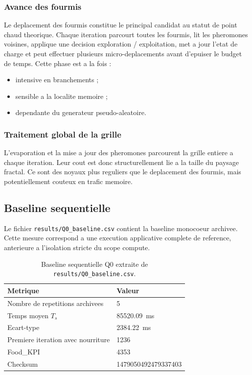 \documentclass[11pt,a4paper]{article}
\begin{document}
\subsubsection{Avance des fourmis}

Le deplacement des fourmis constitue le principal candidat au statut de point chaud theorique. Chaque iteration parcourt toutes les fourmis, lit les pheromones voisines, applique une decision exploration / exploitation, met a jour l'etat de charge et peut effectuer plusieurs micro-deplacements avant d'epuiser le budget de temps. Cette phase est a la fois :

\begin{itemize}[leftmargin=1.2em]
  \item intensive en branchements ;
  \item sensible a la localite memoire ;
  \item dependante du generateur pseudo-aleatoire.
\end{itemize}

\subsubsection{Traitement global de la grille}

L'evaporation et la mise a jour des pheromones parcourent la grille entiere a chaque iteration. Leur cout est donc structurellement lie a la taille du paysage fractal. Ce sont des noyaux plus reguliers que le deplacement des fourmis, mais potentiellement couteux en trafic memoire.

\subsection{Baseline sequentielle}

Le fichier \texttt{results/Q0\_baseline.csv} contient la baseline monocoeur archivee. Cette mesure correspond a une execution applicative complete de reference, anterieure a l'isolation stricte du scope compute.

\begin{table}[H]
  \centering
  \small
  \caption{Baseline sequentielle Q0 extraite de \texttt{results/Q0\_baseline.csv}.}
  \label{tab:q0-baseline}
  \begin{tabular}{@{}ll@{}}
    \toprule
    Metrique & Valeur \\
    \midrule
    Nombre de repetitions archivees & 5 \\
    Temps moyen \(T_s\) & \SI{85520.09}{ms} \\
    Ecart-type & \SI{2384.22}{ms} \\
    Premiere iteration avec nourriture & 1236 \\
    Food\_KPI & 4353 \\
    Checksum & 1479050492479337403 \\
    \bottomrule
  \end{tabular}
\end{table}
\end{document}
